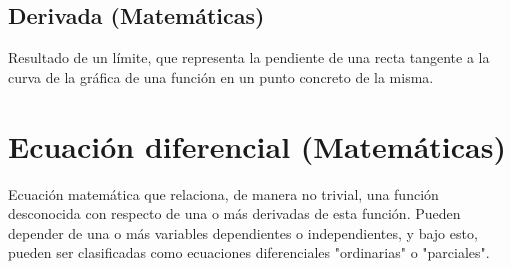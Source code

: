 
\subsection{Derivada (Matemáticas)}
Resultado de un límite, que representa la pendiente de una recta tangente a la curva de la gráfica de una función en un punto concreto de la misma.


\section{Ecuación diferencial (Matemáticas)}

Ecuación matemática que relaciona, de manera no trivial, una función desconocida con respecto de una o más derivadas de esta función. Pueden depender de una o más variables dependientes o independientes, y bajo esto, pueden ser clasificadas como ecuaciones diferenciales "ordinarias" o "parciales".